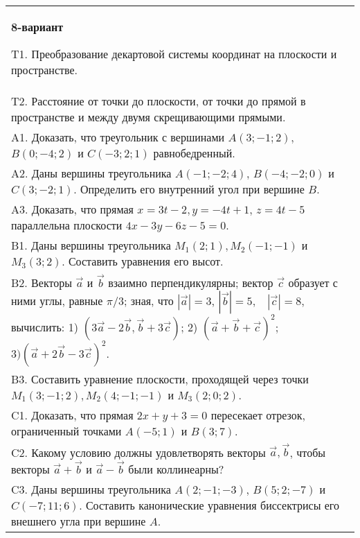 \documentclass{article}
\begin{document}
\begin{tabular}{m{17cm}}
\textbf{8-вариант}
\newline

T1. 
Преобразование декартовой системы координат на плоскости и пространстве. \\
T2. 
Расстояние от точки до плоскости, от точки до прямой в пространстве и между двумя скрещивающими прямыми. \\
A1. 
Доказать, что треугольник с вершинами \(A(3; - 1;2)\), \(B(0; - 4;2)\) и \(C( - 3;2;1)\) равнобедренный.
 \\
A2. 
Даны вершины треугольника \(A( - 1; - 2;4)\), \(B( - 4; - 2;0)\) и \(C(3; - 2;1)\). Определить его внутренний угол при вершине \(B\).
 \\
A3. 
Доказать, что прямая \(x = 3t - 2,y = - 4t + 1\), \(z = 4t - 5\) параллельна плоскости \(4x - 3y - 6z - 5 = 0\).
 \\
B1. 
Даны вершины треугольника \(M_{1}(2;1),M_{2}( - 1; - 1)\) и \(M_{3}(3;2)\). Составить уравнения его высот.
 \\
B2. 
Векторы \(\overrightarrow{a}\) и \(\overrightarrow{b}\) взаимно перпендикулярны; вектор \(\overrightarrow{c}\) образует с ними углы, равные \(\pi/3\); зная, что \(|\overrightarrow{a}| = 3\), \(|\overrightarrow{b}| = 5,\ \ \ \ |\overrightarrow{c}| = 8\), вычислить: 1) \(\left( 3\overrightarrow{a} - 2\overrightarrow{b},\overrightarrow{b} + 3\overrightarrow{c} \right)\); 2) \((\overrightarrow{a} + \overrightarrow{b} + \overrightarrow{c})^{2};\) \(3)(\overrightarrow{a} + 2\overrightarrow{b} - 3\overrightarrow{c})^{2}\).
 \\
B3. 
Составить уравнение плоскости, проходящей через точки \(M_{1}(3; - 1;2),M_{2}(4; - 1; - 1)\) и \(M_{3}(2;0;2)\).
 \\
C1. 
Доказать, что прямая \(2x + y + 3 = 0\) пересекает отрезок, ограниченный точками \(A( - 5;1)\) и \(B(3;7)\).
 \\
C2. 
Какому условию должны удовлетворять векторы \(\overrightarrow{a},\overrightarrow{b}\), чтобы векторы \(\overrightarrow{a} + \overrightarrow{b}\) и \(\overrightarrow{a} - \overrightarrow{b}\) были коллинеарны?
 \\
C3. 
Даны вершины треугольника \(A(2; - 1; - 3)\), \(B(5;2; - 7)\) и \(C( - 7;11;6)\). Составить канонические уравнения биссектрисы его внешнего угла при вершине \(A\).
 \\

\end{tabular}
\vspace{1cm}
\end{document}
